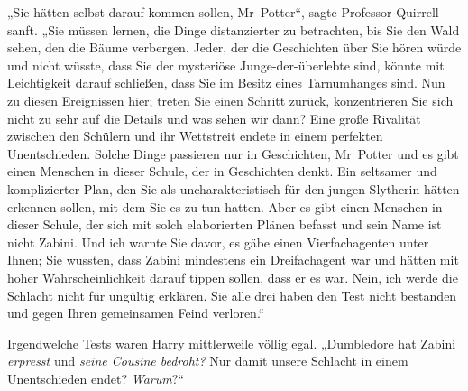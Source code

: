 „Sie hätten selbst darauf kommen sollen, Mr~Potter“, sagte Professor Quirrell sanft. „Sie müssen lernen, die Dinge distanzierter zu betrachten, bis Sie den Wald sehen, den die Bäume verbergen. Jeder, der die Geschichten über Sie hören würde und nicht wüsste, dass Sie der mysteriöse Junge-der-überlebte sind, könnte mit Leichtigkeit darauf schließen, dass Sie im Besitz eines Tarnumhanges sind. Nun zu diesen Ereignissen hier; treten Sie einen Schritt zurück, konzentrieren Sie sich nicht zu sehr auf die Details und was sehen wir dann? Eine große Rivalität zwischen den Schülern und ihr Wettstreit endete in einem perfekten Unentschieden. Solche Dinge passieren nur in Geschichten, Mr~Potter und es gibt einen Menschen in dieser Schule, der in Geschichten denkt. Ein seltsamer und komplizierter Plan, den Sie als uncharakteristisch für den jungen Slytherin hätten erkennen sollen, mit dem Sie es zu tun hatten. Aber es gibt einen Menschen in dieser Schule, der sich mit solch elaborierten Plänen befasst und sein Name ist nicht Zabini. Und ich warnte Sie davor, es gäbe einen Vierfachagenten unter Ihnen; Sie wussten, dass Zabini mindestens ein Dreifachagent war und hätten mit hoher Wahrscheinlichkeit darauf tippen sollen, dass er es war. Nein, ich werde die Schlacht nicht für ungültig erklären. Sie alle drei haben den Test nicht bestanden und gegen Ihren gemeinsamen Feind verloren.“

Irgendwelche Tests waren Harry mittlerweile völlig egal. „Dumbledore hat Zabini \emph{erpresst} und \emph{seine Cousine bedroht?} Nur damit unsere Schlacht in einem Unentschieden endet? \emph{Warum}?“

